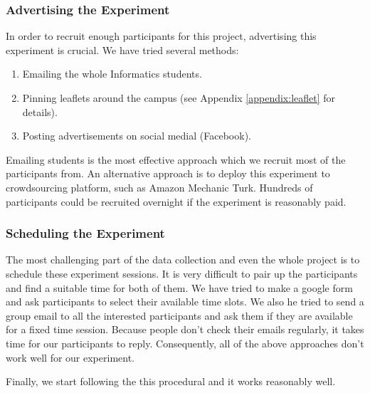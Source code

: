 \documentclass[bsc,frontabs,twoside,singlespacing,parskip,deptreport]{infthesis}     %
\begin{document}
\subsubsection*{Advertising the Experiment}

In order to recruit enough participants for this project, advertising this experiment is crucial. We have tried several methods:

\begin{enumerate}
   \item Emailing the whole Informatics students.

   \item Pinning leaflets around the campus (see Appendix \ref{appendix:leaflet} for details). 
 
   \item Posting advertisements on social medial (Facebook).
\end{enumerate}

Emailing students is the most effective approach which we recruit most of the participants from. An alternative approach is to deploy this experiment to crowdsourcing platform, such as Amazon Mechanic Turk\cite{mturk}. Hundreds of participants could be recruited overnight if the experiment is reasonably paid.


\subsubsection*{Scheduling the Experiment}

The most challenging part of the data collection and even the whole project is to schedule these experiment sessions. It is very difficult to pair up the participants and find a suitable time for both of them. We have tried to make a google form and ask participants to select their available time slots. We also he tried to send a group email to  all the interested participants and ask them if they are available for a fixed time session. Because people don't check their emails regularly, it takes time for our participants to reply. Consequently, all of the above approaches don't work well for our experiment.

Finally, we start following the this procedural and it works reasonably well.
\end{document}
